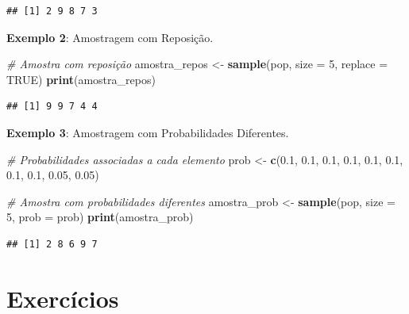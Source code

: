 \documentclass[
]{book}
\newenvironment{Shaded}{\begin{snugshade}}{\end{snugshade}}
\newcommand{\AttributeTok}[1]{\textcolor[rgb]{0.13,0.29,0.53}{#1}}
\newcommand{\CommentTok}[1]{\textcolor[rgb]{0.56,0.35,0.01}{\textit{#1}}}
\newcommand{\ConstantTok}[1]{\textcolor[rgb]{0.56,0.35,0.01}{#1}}
\newcommand{\DecValTok}[1]{\textcolor[rgb]{0.00,0.00,0.81}{#1}}
\newcommand{\FloatTok}[1]{\textcolor[rgb]{0.00,0.00,0.81}{#1}}
\newcommand{\FunctionTok}[1]{\textcolor[rgb]{0.13,0.29,0.53}{\textbf{#1}}}
\newcommand{\NormalTok}[1]{#1}
\newcommand{\OtherTok}[1]{\textcolor[rgb]{0.56,0.35,0.01}{#1}}
\begin{document}
\begin{verbatim}
## [1] 2 9 8 7 3
\end{verbatim}

\textbf{Exemplo 2}: Amostragem com Reposição.

\begin{Shaded}
\begin{Highlighting}[]
\CommentTok{\# Amostra com reposição}
\NormalTok{amostra\_repos }\OtherTok{\textless{}{-}} \FunctionTok{sample}\NormalTok{(pop, }\AttributeTok{size =} \DecValTok{5}\NormalTok{, }\AttributeTok{replace =} \ConstantTok{TRUE}\NormalTok{)}
\FunctionTok{print}\NormalTok{(amostra\_repos)}
\end{Highlighting}
\end{Shaded}

\begin{verbatim}
## [1] 9 9 7 4 4
\end{verbatim}

\textbf{Exemplo 3}: Amostragem com Probabilidades Diferentes.

\begin{Shaded}
\begin{Highlighting}[]
\CommentTok{\# Probabilidades associadas a cada elemento}
\NormalTok{prob }\OtherTok{\textless{}{-}} \FunctionTok{c}\NormalTok{(}\FloatTok{0.1}\NormalTok{, }\FloatTok{0.1}\NormalTok{, }\FloatTok{0.1}\NormalTok{, }\FloatTok{0.1}\NormalTok{, }\FloatTok{0.1}\NormalTok{, }\FloatTok{0.1}\NormalTok{, }\FloatTok{0.1}\NormalTok{, }\FloatTok{0.1}\NormalTok{, }\FloatTok{0.05}\NormalTok{, }\FloatTok{0.05}\NormalTok{)}

\CommentTok{\# Amostra com probabilidades diferentes}
\NormalTok{amostra\_prob }\OtherTok{\textless{}{-}} \FunctionTok{sample}\NormalTok{(pop, }\AttributeTok{size =} \DecValTok{5}\NormalTok{, }\AttributeTok{prob =}\NormalTok{ prob)}
\FunctionTok{print}\NormalTok{(amostra\_prob)}
\end{Highlighting}
\end{Shaded}

\begin{verbatim}
## [1] 2 8 6 9 7
\end{verbatim}

\section{Exercícios}\label{exercuxedcios-11}
\end{document}

